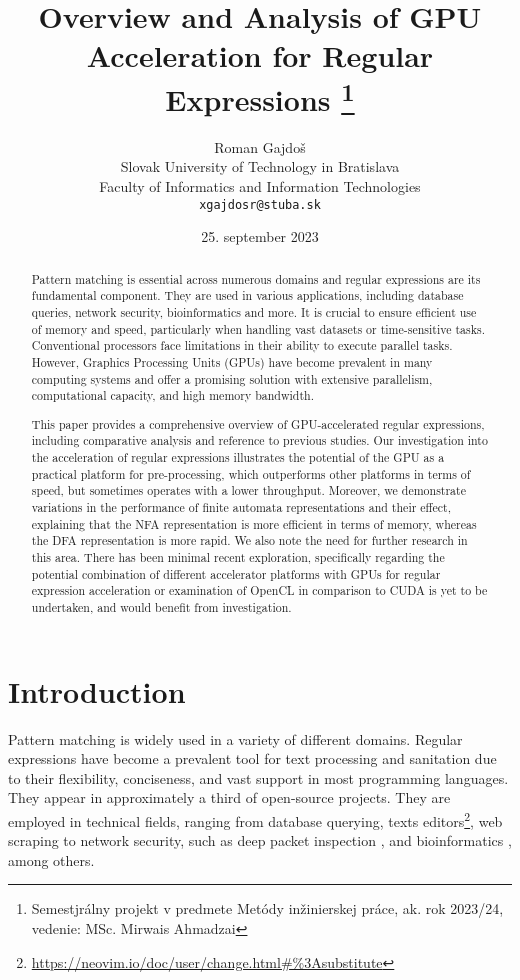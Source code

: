 \documentclass[10pt,onecolumn,twoside,english,a4paper]{article}
\title{Overview and Analysis of GPU Acceleration for Regular Expressions
\thanks{Semestjrálny projekt v predmete Metódy inžinierskej práce, ak. rok 2023/24, vedenie: MSc. Mirwais Ahmadzai}} %
\author{Roman Gajdoš\\[2pt]
	{\small Slovak University of Technology in Bratislava}\\
	{\small Faculty of Informatics and Information Technologies}\\
	{\small \texttt{xgajdosr@stuba.sk}}
	}
\date{\small 25. september 2023} %
\begin{document}
\maketitle

\begin{abstract}
  Pattern matching is essential across numerous domains and regular expressions are its fundamental component. They are used in various applications, including database queries, network security, bioinformatics and more. It is crucial to ensure efficient use of memory and speed, particularly when handling vast datasets or time-sensitive tasks.
  Conventional processors face limitations in their ability to execute parallel tasks. However, Graphics Processing Units (GPUs) have become prevalent in many computing systems and offer a promising solution with extensive parallelism, computational capacity, and high memory bandwidth.

  This paper provides a comprehensive overview of GPU-accelerated regular expressions, including comparative analysis and reference to previous studies. Our investigation into the acceleration of regular expressions illustrates the potential of the GPU as a practical platform for pre-processing, which outperforms other platforms in terms of speed, but sometimes operates with a lower throughput. Moreover, we demonstrate variations in the performance of finite automata representations and their effect, explaining that the NFA representation is more efficient in terms of memory, whereas the DFA representation is more rapid. We also note the need for further research in this area. There has been minimal recent exploration, specifically regarding the potential combination of different accelerator platforms with GPUs for regular expression acceleration or examination of OpenCL in comparison to CUDA is yet to be undertaken, and would benefit from investigation.

\end{abstract}

\section{Introduction} \label{Introduction}
Pattern matching is widely used in a variety of different domains. Regular expressions have become a prevalent tool for text processing and sanitation due to their flexibility, conciseness, and vast support in most programming languages\cite{Chapman:Usage}. They appear in approximately a third of open-source projects\cite{Davis:Re-use}. They are employed in technical fields, ranging from database querying\cite{István:databases-regex}, texts editors\footnote{\url{https://neovim.io/doc/user/change.html\#\%3Asubstitute}}, web scraping \cite{Gunawan2019/03} to network security, such as deep packet inspection \cite{becchi2008workload}, and bioinformatics \cite{huang2008gpu}, among others.
\end{document}
